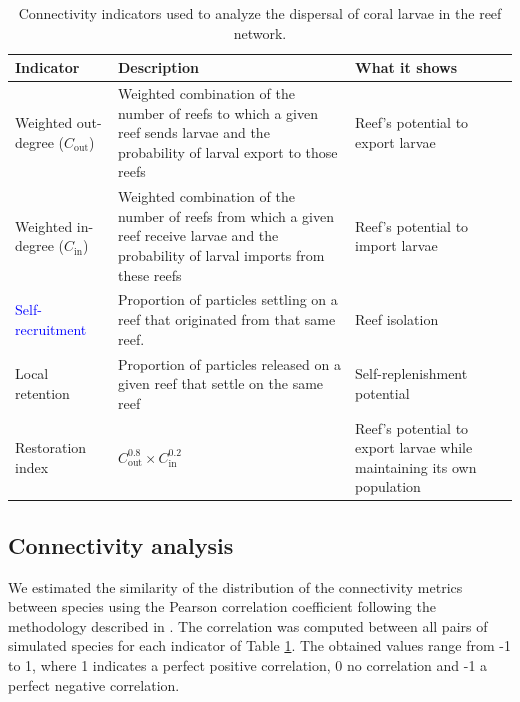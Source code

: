 \documentclass[preprint,12pt,authoryear]{elsarticle}
\newcommand{\modif}[1]{\textcolor{blue}{#1}}
\begin{document}
	\begin{table}
		\begin{adjustwidth}{-1in}{-1in}
			\centering
			\small
			\begin{tabular}{p{}p{}p{}}
				\hline
				\textbf{Indicator} & \textbf{Description} & \textbf{What it shows} \\
				\hline
				Weighted out-degree ($C_\text{out}$) & Weighted combination of the number of reefs to which a given reef sends larvae and the probability of larval export to those reefs & Reef's potential to export larvae \\
				Weighted in-degree ($C_\text{in}$) & Weighted combination of the number of reefs from which a given reef receive larvae and the probability of larval imports from these reefs & Reef's potential to import larvae \\
				\modif{Self-recruitment} & Proportion of particles settling on a reef that originated from that same reef. & Reef isolation \pdfcomment[color=orange,author=Dan]{To be discussed} \\
				Local retention & Proportion of particles released on a given reef that settle on the same reef & Self-replenishment potential \\
				Restoration index & $C_\text{out}^{0.8} \times C_\text{in}^{0.2}$ & Reef's potential to export larvae while maintaining its own population \\
				\hline
			\end{tabular}
		\end{adjustwidth}
		\caption{Connectivity indicators used to analyze the dispersal of coral larvae in the reef network.}\label{tab:indicators}
	\end{table}
	
	\subsection*{Connectivity analysis}
	
	We estimated the similarity of the distribution of the connectivity metrics between species using the Pearson correlation coefficient following the methodology described in \cite{boccaletti2014structure}. The correlation was computed between all pairs of simulated species for each indicator of Table \ref{tab:indicators}. The obtained values range from -1 to 1, where 1 indicates a perfect positive correlation, 0 no correlation and -1 a perfect negative correlation.
	
\end{document}
